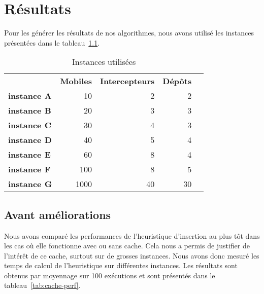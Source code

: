 \chapter{Résultats}
\label{chap:resultats}

	Pour les générer les résultats de nos algorithmes, nous avons utilisé les instances présentées dans le tableau~\ref{tab:instances}.
	
	\begin{table}[h!]
		\centering
		\begin{tabular}{l|r|r|r|l}
		\cline{2-4}
                                                                     & \multicolumn{1}{c|}{\textbf{Mobiles}} & \multicolumn{1}{c|}{\textbf{Intercepteurs}} & \multicolumn{1}{c|}{\textbf{Dépôts}} &  \\ \cline{1-4}
            \multicolumn{1}{|l|}{\textbf{instance A}}   & 10                               & 2                               & 2                               &  \\ \cline{1-4}
            \multicolumn{1}{|l|}{\textbf{instance B}}   & 20                               & 3                               & 3                               &  \\ \cline{1-4}
            \multicolumn{1}{|l|}{\textbf{instance C}}   & 30                               & 4                               & 3                               &  \\ \cline{1-4}
            \multicolumn{1}{|l|}{\textbf{instance D}}   & 40                               & 5                               & 4                               &  \\ \cline{1-4}
            \multicolumn{1}{|l|}{\textbf{instance E}}   & 60                               & 8                               & 4                               &  \\ \cline{1-4}
            \multicolumn{1}{|l|}{\textbf{instance F}}  & 100                                & 8                               & 5                               &  \\ \cline{1-4}
            \multicolumn{1}{|l|}{\textbf{instance G}} & 1000                                & 40                           & 30                               &  \\ \cline{1-4}
            \end{tabular}
            \caption{Instances utilisées}
            \label{tab:instances}
        \end{table}
		

    \section{Avant améliorations}
        Nous avons comparé les performances de l'heuristique d'insertion au plus tôt dans les cas où elle fonctionne avec ou sans cache. Cela nous a permis de justifier de l'intérêt de ce cache, surtout sur de grosses instances. Nous avons donc mesuré les temps de calcul de l'heuristique sur différentes instances. Les résultats sont obtenus par moyennage sur 100 exécutions et sont présentés dans le tableau~\ref{tab:cache-perf}.

